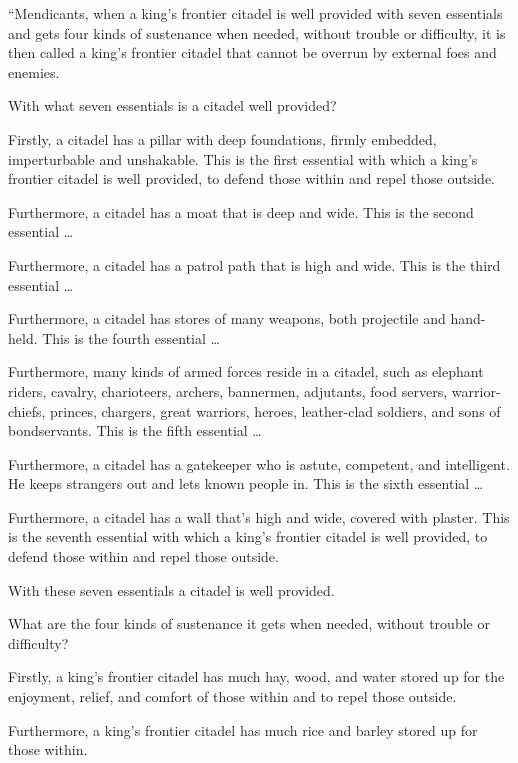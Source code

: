 \documentclass[12pt,openany]{book}%
\begin{document}
“Mendicants, when a king’s frontier citadel is well provided with seven essentials and gets four kinds of sustenance when needed, without trouble or difficulty, it is then called a king’s frontier citadel that cannot be overrun by external foes and enemies. 

With what seven essentials is a citadel well provided? 

Firstly, a citadel has a pillar with deep foundations, firmly embedded, imperturbable and unshakable. This is the first essential with which a king’s frontier citadel is well provided, to defend those within and repel those outside. 

Furthermore, a citadel has a moat that is deep and wide. This is the second essential … 

Furthermore, a citadel has a patrol path that is high and wide. This is the third essential … 

Furthermore, a citadel has stores of many weapons, both projectile and hand-held. This is the fourth essential … 

Furthermore, many kinds of armed forces reside in a citadel, such as elephant riders, cavalry, charioteers, archers, bannermen, adjutants, food servers, warrior-chiefs, princes, chargers, great warriors, heroes, leather-clad soldiers, and sons of bondservants. This is the fifth essential … 

Furthermore, a citadel has a gatekeeper who is astute, competent, and intelligent. He keeps strangers out and lets known people in. This is the sixth essential … 

Furthermore, a citadel has a wall that’s high and wide, covered with plaster. This is the seventh essential with which a king’s frontier citadel is well provided, to defend those within and repel those outside. 

With these seven essentials a citadel is well provided. 

What are the four kinds of sustenance it gets when needed, without trouble or difficulty? 

Firstly, a king’s frontier citadel has much hay, wood, and water stored up for the enjoyment, relief, and comfort of those within and to repel those outside. 

Furthermore, a king’s frontier citadel has much rice and barley stored up for those within. 
\end{document}
